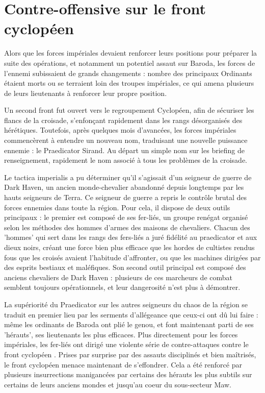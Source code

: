 \documentclass[10pt,a4paper]{book}
\newcommand{\front}{front cyclopéen }
\begin{document}
\section{Contre-offensive sur le  \front}
Alors que les forces impériales devaient renforcer leurs positions pour préparer la suite des opérations, et notamment un potentiel assaut sur Baroda, les forces de l'ennemi subissaient de grands changements : nombre des principaux Ordinants étaient morts ou se terraient loin des troupes impériales, ce qui amena plusieurs de leurs lieutenants à renforcer leur propre position.

Un second front fut ouvert vers le regroupement Cyclopéen, afin de sécuriser les flancs de la croisade, s'enfonçant rapidement dans les rangs désorganisés des hérétiques. Toutefois, après quelques mois d'avancées, les forces impériales commencèrent à entendre un nouveau nom, traduisant une nouvelle puissance ennemie : le Praedicator Sirand. Au départ un simple nom sur les briefing de renseignement, rapidement le nom associé à tous les problèmes de la croisade.

Le tactica imperialis a pu déterminer qu'il s'agissait d'un seigneur de guerre de Dark Haven, un ancien monde-chevalier abandonné depuis longtemps par les hauts seigneurs de Terra. Ce seigneur de guerre a repris le contrôle brutal des forces ennemies dans toute la région. Pour cela, il dispose de deux outils principaux : le premier est composé de ses fer-liés, un groupe renégat organisé selon les méthodes des hommes d'armes des maisons de chevaliers. Chacun des 'hommes' qui sert dans les rangs des fers-liés a juré fidélité au praedicator et aux dieux noirs, créant une force bien plus efficace que les hordes de cultistes rendus fous que les croisés avaient l'habitude d'affronter, ou que les machines dirigées par des esprits bestiaux et maléfiques. Son second outil principal est composé des anciens chevaliers de Dark Haven : plusieurs de ces marcheurs de combat semblent toujours opérationnels, et leur dangerosité n'est plus à démontrer.

La supériorité du Praedicator sur les autres seigneurs du chaos de la région se traduit en premier lieu par les serments d'allégeance que ceux-ci ont dû lui faire : même les ordinants de Baroda ont plié le genou, et font maintenant parti de ses 'hérauts', ses lieutenants les plus efficaces. Plus directement pour les forces impériales, les fer-liés ont dirigé une violente série de contre-attaques contre le \front . Prises par surprise par des assauts disciplinés et bien maîtrisés, le \front menace maintenant de s'effondrer. Cela a été renforcé par plusieurs insurrections manigancées par certains des hérauts les plus subtils sur certains de leurs anciens mondes et jusqu'au coeur du sous-secteur Maw.
\end{document}
